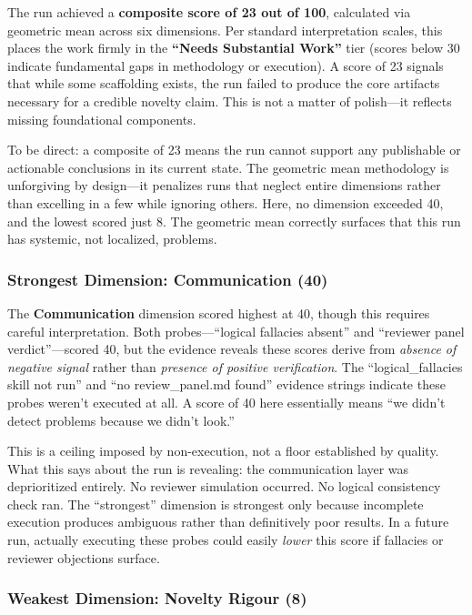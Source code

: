 \documentclass[10pt,letterpaper]{article}
\begin{document}
The run achieved a \textbf{composite score of 23 out of 100}, calculated via geometric mean across six dimensions. Per standard interpretation scales, this places the work firmly in the \textbf{``Needs Substantial Work''} tier (scores below 30 indicate fundamental gaps in methodology or execution). A score of 23 signals that while some scaffolding exists, the run failed to produce the core artifacts necessary for a credible novelty claim. This is not a matter of polish---it reflects missing foundational components.

To be direct: a composite of 23 means the run cannot support any publishable or actionable conclusions in its current state. The geometric mean methodology is unforgiving by design---it penalizes runs that neglect entire dimensions rather than excelling in a few while ignoring others. Here, no dimension exceeded 40, and the lowest scored just 8. The geometric mean correctly surfaces that this run has systemic, not localized, problems.

\hypertarget{strongest-dimension-communication-40}{%
\subsubsection{Strongest Dimension: Communication (40)}\label{strongest-dimension-communication-40}}

The \textbf{Communication} dimension scored highest at 40, though this requires careful interpretation. Both probes---``logical fallacies absent'' and ``reviewer panel verdict''---scored 40, but the evidence reveals these scores derive from \emph{absence of negative signal} rather than \emph{presence of positive verification}. The ``logical\_fallacies skill not run'' and ``no review\_panel.md found'' evidence strings indicate these probes weren't executed at all. A score of 40 here essentially means ``we didn't detect problems because we didn't look.''

This is a ceiling imposed by non-execution, not a floor established by quality. What this says about the run is revealing: the communication layer was deprioritized entirely. No reviewer simulation occurred. No logical consistency check ran. The ``strongest'' dimension is strongest only because incomplete execution produces ambiguous rather than definitively poor results. In a future run, actually executing these probes could easily \emph{lower} this score if fallacies or reviewer objections surface.

\hypertarget{weakest-dimension-novelty-rigour-8}{%
\subsubsection{Weakest Dimension: Novelty Rigour (8)}\label{weakest-dimension-novelty-rigour-8}}
\end{document}
